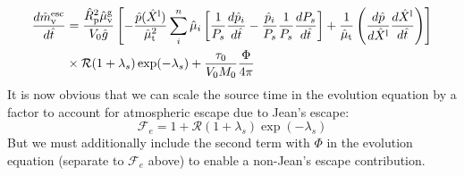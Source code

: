 \begin{align}
\frac{d \hat{m}_{\rm v}^{\rm esc}}{d\hat{t}} &= \frac{\hat{R}_{\rm p}^2 \hat{\mu}_{\rm v}^{\rm g}}{V_0\hat{g}}
\left[
-\frac{\hat{p}(\hat{X}^{\rm l})}{\hat{\mu}_{\rm t}^2} \sum_i^n \hat{\mu}_i \left[ \frac{1}{P_s} \frac{d \hat{p}_i}{d \hat{t}} - \frac{\hat{p}_i}{P_s} \frac{1}{P_s} \frac{d P_s}{d \hat{t}} \right] + \frac{1}{\hat{\mu}_{\rm t}} \left( \frac{d \hat{p}}{d \hat{X}^{\rm l}} \frac{d \hat{X}^{\rm l}}{d \hat{t}} \right)
\right]\\
& \times \mathcal{R} (1 + \lambda_s) \exp(-\lambda_s) + \frac{\tau_0}{V_0 M_0} \frac{\Phi}{4 \pi}
\end{align}
It is now obvious that we can scale the source time in the evolution equation by a factor to account for atmospheric escape due to Jean's escape:
\begin{equation}
\mathcal{F}_e = 1+\mathcal{R} (1 + \lambda_s) \exp(-\lambda_s)
\end{equation}
But we must additionally include the second term with $\Phi$ in the evolution equation (separate to $\mathcal{F}_e$ above) to enable a non-Jean's escape contribution.

